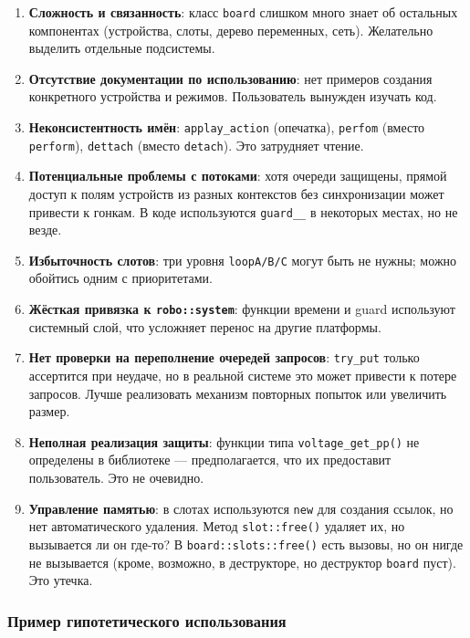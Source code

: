 \documentclass[a4paper,12pt]{article}
\begin{document}
\begin{enumerate}
    \item \textbf{Сложность и связанность}: класс \texttt{board} слишком много знает об остальных компонентах (устройства, слоты, дерево переменных, сеть). Желательно выделить отдельные подсистемы.
    \item \textbf{Отсутствие документации по использованию}: нет примеров создания конкретного устройства и режимов. Пользователь вынужден изучать код.
    \item \textbf{Неконсистентность имён}: \texttt{applay\_action} (опечатка), \texttt{perfom} (вместо \texttt{perform}), \texttt{dettach} (вместо \texttt{detach}). Это затрудняет чтение.
    \item \textbf{Потенциальные проблемы с потоками}: хотя очереди защищены, прямой доступ к полям устройств из разных контекстов без синхронизации может привести к гонкам. В коде используются \texttt{guard\_\_} в некоторых местах, но не везде.
    \item \textbf{Избыточность слотов}: три уровня \texttt{loopA/B/C} могут быть не нужны; можно обойтись одним с приоритетами.
    \item \textbf{Жёсткая привязка к \texttt{robo::system}}: функции времени и guard используют системный слой, что усложняет перенос на другие платформы.
    \item \textbf{Нет проверки на переполнение очередей запросов}: \texttt{try\_put} только ассертится при неудаче, но в реальной системе это может привести к потере запросов. Лучше реализовать механизм повторных попыток или увеличить размер.
    \item \textbf{Неполная реализация защиты}: функции типа \texttt{voltage\_get\_pp()} не определены в библиотеке — предполагается, что их предоставит пользователь. Это не очевидно.
    \item \textbf{Управление памятью}: в слотах используются \texttt{new} для создания ссылок, но нет автоматического удаления. Метод \texttt{slot::free()} удаляет их, но вызывается ли он где-то? В \texttt{board::slots::free()} есть вызовы, но он нигде не вызывается (кроме, возможно, в деструкторе, но деструктор \texttt{board} пуст). Это утечка.
\end{enumerate}

\subsubsection{Пример гипотетического использования}
\end{document}
